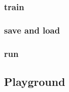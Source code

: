 \subsubsection{train}

\subsubsection{save and load}

\subsubsection{run}




\subsection{Playground}
\label{subsec:implementation-playground}








